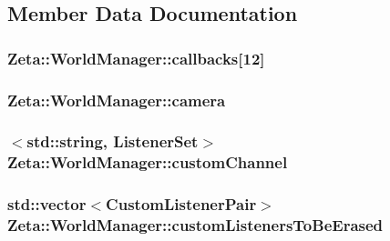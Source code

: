 \subsection{Member Data Documentation}
\hypertarget{classZeta_1_1WorldManager_ad7cd870adcdb916ad11ebd770e7e17bf}{
\subsubsection[{callbacks}]{ Zeta\+::\+World\+Manager\+::callbacks\mbox{[}12\mbox{]}\hspace{0.3cm}{\ttfamily [private]}}}\label{classZeta_1_1WorldManager_ad7cd870adcdb916ad11ebd770e7e17bf}
\hypertarget{classZeta_1_1WorldManager_a66357a14540415262464a5fc35ae75fd}{
\subsubsection[{camera}]{ Zeta\+::\+World\+Manager\+::camera\hspace{0.3cm}{\ttfamily [private]}}}\label{classZeta_1_1WorldManager_a66357a14540415262464a5fc35ae75fd}
\hypertarget{classZeta_1_1WorldManager_ab268372a957917e58c113083087fb4a5}{
\subsubsection[{custom\+Channel}]{$<$std\+::string, {\bf Listener\+Set}$>$ Zeta\+::\+World\+Manager\+::custom\+Channel\hspace{0.3cm}{\ttfamily [private]}}}\label{classZeta_1_1WorldManager_ab268372a957917e58c113083087fb4a5}
\hypertarget{classZeta_1_1WorldManager_a4737df2046668caffa598cf1e2b7e153}{
\subsubsection[{custom\+Listeners\+To\+Be\+Erased}]{\setlength{\rightskip}{0pt plus 5cm}std\+::vector$<${\bf Custom\+Listener\+Pair}$>$ Zeta\+::\+World\+Manager\+::custom\+Listeners\+To\+Be\+Erased\hspace{0.3cm}{\ttfamily [private]}}}\label{classZeta_1_1WorldManager_a4737df2046668caffa598cf1e2b7e153}
